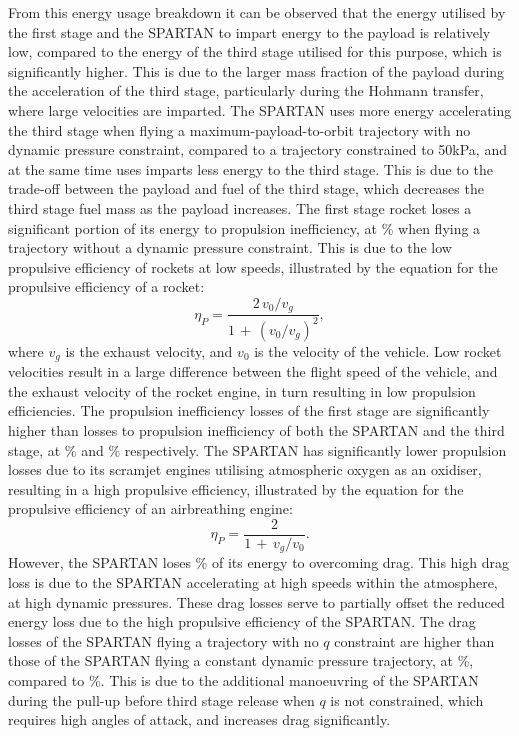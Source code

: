 From this energy usage breakdown it can be observed that the energy utilised by the first stage and the SPARTAN to impart energy to the payload is relatively low, compared to the energy of the third stage utilised for this purpose, which is significantly higher. This is due to the larger mass fraction of the payload during the acceleration of the third stage, particularly during the Hohmann transfer, where large velocities are imparted. 
The SPARTAN uses more energy accelerating the third stage when flying a maximum-payload-to-orbit trajectory with no dynamic pressure constraint, compared to a trajectory constrained to 50kPa, and at the same time uses imparts less energy to the third stage. This is due to the trade-off between the payload and fuel of the third stage, which decreases the third stage fuel mass as the payload increases. 
The first stage rocket loses a significant portion of its energy to propulsion inefficiency, at \PlossoneCombinedStandardNoReturn \% when flying a trajectory without a dynamic pressure constraint.  This is due to the low propulsive efficiency of rockets at low speeds, illustrated by the equation for the propulsive efficiency of a rocket\cite{RPE}:
\begin{equation}\label{eq:rocketeff}
\eta_P = \frac{2\,v_0/v_g}{1\,+\,(v_0/v_g)^2}, 
\end{equation}
where $v_g$ is the exhaust velocity, and $v_0$ is the velocity of the vehicle.
Low rocket velocities result in a large difference between the flight speed of the vehicle, and the exhaust velocity of the rocket engine, in turn resulting in low propulsion efficiencies. 
The propulsion inefficiency losses of the first stage are significantly higher than losses to propulsion inefficiency of both the SPARTAN and the third stage, at \PlosssecondCombinedStandardNoReturn \% and \PlossthreeCombinedStandardNoReturn \% respectively.
The SPARTAN has significantly lower propulsion losses due to its scramjet engines utilising atmospheric oxygen as an oxidiser, resulting in a high propulsive efficiency, illustrated by the equation for the propulsive efficiency of an airbreathing engine\cite{Spittle2003}:
\begin{equation}
 \eta_P = \frac{2}{1\,+\,v_g/v_0}. 
\end{equation}
 However, the SPARTAN loses \WDsecondStandardNoReturn \% of its energy to overcoming drag. This high drag loss is due to the SPARTAN accelerating at high speeds within the atmosphere, at high dynamic pressures. These drag losses serve to partially offset the reduced energy loss due to the high propulsive efficiency of the SPARTAN. 
The drag losses of the SPARTAN flying a trajectory with no $q$ constraint are higher than those of the SPARTAN flying a constant dynamic pressure trajectory, at \WDsecondStandardNoReturn\%, compared to \WDsecondConstqNoReturn\%. This is due to the additional manoeuvring of the SPARTAN during the pull-up before third stage release when $q$ is not constrained, which requires high angles of attack, and increases drag significantly. 

